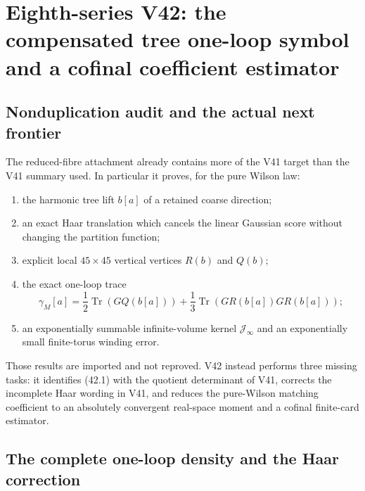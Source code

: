 \documentclass[11pt,oneside]{book}
\theoremstyle{definition}
\theoremstyle{remark}
\newcommand{\Tr}{\operatorname{Tr}}
\begin{document}


\section{Eighth-series V42: the compensated tree one-loop symbol and a
cofinal coefficient estimator}
\label{sec:e8v42}

\subsection{Nonduplication audit and the actual next frontier}

The reduced-fibre attachment already contains more of the V41 target
than the V41 summary used.  In particular it proves, for the pure
Wilson law:
\begin{enumerate}
\item the harmonic tree lift \(b[a]\) of a retained coarse direction;
\item an exact Haar translation which cancels the linear Gaussian
      score without changing the partition function;
\item explicit local \(45\times45\) vertical vertices \(R(b)\) and
      \(Q(b)\);
\item the exact one-loop trace
      \[
       \gamma_M[a]
       =\frac12\Tr(GQ(b[a]))
        +\frac13\Tr(GR(b[a])GR(b[a]));                           \tag{42.1}
      \]
\item an exponentially summable infinite-volume kernel
      \(\mathcal J_\infty\) and an exponentially small finite-torus
      winding error.
\end{enumerate}
Those results are imported and not reproved.  V42 instead performs
three missing tasks: it identifies (42.1) with the quotient
determinant of V41, corrects the incomplete Haar wording in V41, and
reduces the pure-Wilson matching coefficient to an absolutely
convergent real-space moment and a cofinal finite-card estimator.

\subsection{The complete one-loop density and the Haar correction}
\end{document}
